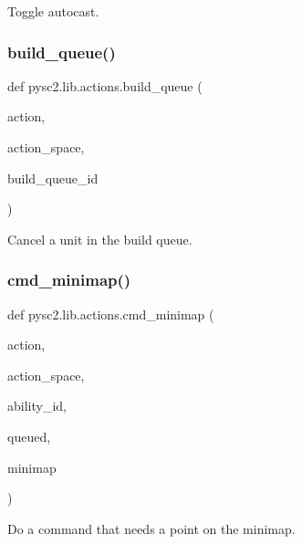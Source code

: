 \begin{DoxyVerb}Toggle autocast.\end{DoxyVerb}
 \mbox{\label{namespacepysc2_1_1lib_1_1actions_a6fbc9a64791ad0e6dddc5ad9a51e5e5b}} 
\subsubsection{\texorpdfstring{build\+\_\+queue()}{build\_queue()}}
{\footnotesize\ttfamily def pysc2.\+lib.\+actions.\+build\+\_\+queue (\begin{DoxyParamCaption}\item[{}]{action,  }\item[{}]{action\+\_\+space,  }\item[{}]{build\+\_\+queue\+\_\+id }\end{DoxyParamCaption})}

\begin{DoxyVerb}Cancel a unit in the build queue.\end{DoxyVerb}
 \mbox{\label{namespacepysc2_1_1lib_1_1actions_a60765a989aa093570dfcb690d81dd2d6}} 
\subsubsection{\texorpdfstring{cmd\+\_\+minimap()}{cmd\_minimap()}}
{\footnotesize\ttfamily def pysc2.\+lib.\+actions.\+cmd\+\_\+minimap (\begin{DoxyParamCaption}\item[{}]{action,  }\item[{}]{action\+\_\+space,  }\item[{}]{ability\+\_\+id,  }\item[{}]{queued,  }\item[{}]{minimap }\end{DoxyParamCaption})}

\begin{DoxyVerb}Do a command that needs a point on the minimap.\end{DoxyVerb}
 \mbox{\label{namespacepysc2_1_1lib_1_1actions_a2129f1b3173891d9a1d311d1dda40d78}} 
